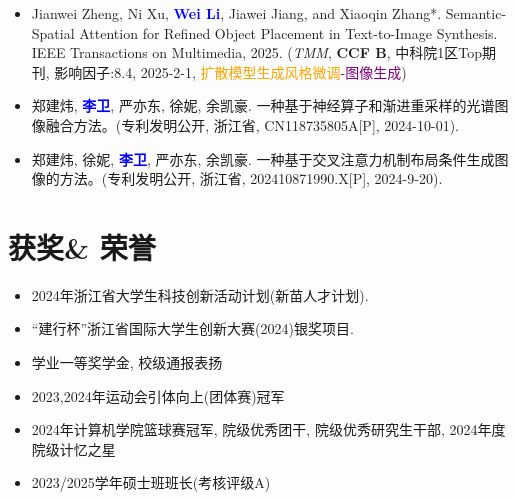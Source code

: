 \documentclass{resume}
\begin{document}
\begin{itemize}[parsep=0.2ex]
  \item Jianwei Zheng, Ni Xu, \textbf{\textcolor{blue}{Wei Li}}, Jiawei Jiang, and Xiaoqin Zhang*. Semantic-Spatial Attention for Refined Object Placement in Text-to-Image Synthesis. IEEE Transactions on Multimedia, 2025. (\textit{TMM}, \textbf{CCF B}, 中科院1区Top期刊, 影响因子:8.4, 2025-2-1, \textcolor{orange}{扩散模型生成风格微调}-\textcolor{Purple}{图像生成})
  
  \item 郑建炜, \textbf{\textcolor{blue}{李卫}}, 严亦东, 徐妮, 余凯豪. 一种基于神经算子和渐进重采样的光谱图像融合方法。(专利发明公开, 浙江省, CN118735805A[P], 2024-10-01).
  \item 郑建炜, 徐妮, \textbf{\textcolor{blue}{李卫}}, 严亦东, 余凯豪. 一种基于交叉注意力机制布局条件生成图像的方法。(专利发明公开, 浙江省, 202410871990.X[P], 2024-9-20).
  

\end{itemize}

\section{\faHandPeaceO 获奖\& 荣誉}
\begin{itemize}[parsep=0.2ex]
  \item 2024年浙江省大学生科技创新活动计划(新苗人才计划).
  \item “建行杯”浙江省国际大学生创新大赛(2024)银奖项目.
  \item 学业一等奖学金, 校级通报表扬
  \item 2023,2024年运动会引体向上(团体赛)冠军
  \item 2024年计算机学院篮球赛冠军, 院级优秀团干, 院级优秀研究生干部, 2024年度院级计忆之星
  \item 2023/2025学年硕士班班长(考核评级A)
\end{itemize}
\end{document}
